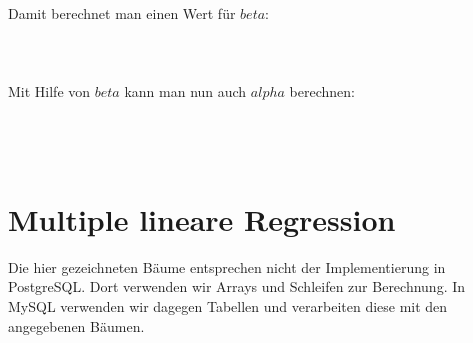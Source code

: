 Damit berechnet man einen Wert für $beta$:
\\\\
\noindent{}
\\\\
Mit Hilfe von $beta$ kann man nun auch $alpha$ berechnen:
\\\\
\noindent{}
\\\\

\section{Multiple lineare Regression}
\label{section:5:2}

Die hier gezeichneten Bäume entsprechen nicht der Implementierung in PostgreSQL. Dort verwenden wir Arrays und Schleifen zur Berechnung. In MySQL verwenden wir dagegen Tabellen und verarbeiten diese mit den angegebenen Bäumen.

